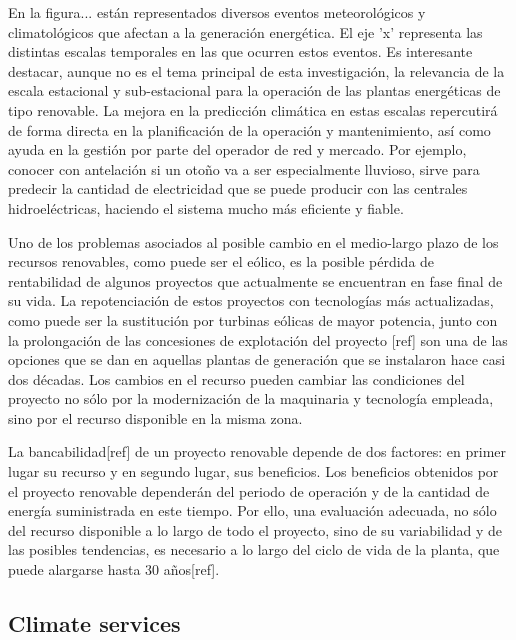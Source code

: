 En la figura... están representados diversos eventos meteorológicos y climatológicos que afectan a la generación energética. El eje 'x' representa las distintas escalas temporales en las que ocurren estos eventos. Es interesante destacar, aunque no es el tema principal de esta investigación, la relevancia de la escala estacional y sub-estacional para la operación de las plantas energéticas de tipo renovable. La mejora en la predicción climática en estas escalas repercutirá de forma directa en la planificación de la operación y mantenimiento, así como ayuda en la gestión por parte del operador de red y mercado. Por ejemplo, conocer con antelación si un otoño va a ser especialmente lluvioso, sirve para predecir la cantidad de electricidad que se puede producir con las centrales hidroeléctricas, haciendo el sistema mucho más eficiente y fiable. 

Uno de los problemas asociados al posible cambio en el medio-largo plazo de los recursos renovables, como puede ser el eólico, es la posible pérdida de rentabilidad de algunos proyectos que actualmente se encuentran en fase final de su vida. La repotenciación de estos proyectos con tecnologías más actualizadas, como puede ser la sustitución por turbinas eólicas de mayor potencia, junto con la prolongación de las concesiones de explotación del proyecto [ref] son una de las opciones que se dan en aquellas plantas de generación que se instalaron hace casi dos décadas. Los cambios en el recurso pueden cambiar las condiciones del proyecto no sólo por la modernización de la maquinaria y tecnología empleada, sino por el recurso disponible en la misma zona.

La bancabilidad[ref] de un proyecto renovable depende de dos factores: en primer lugar su recurso y en segundo lugar, sus beneficios. Los beneficios obtenidos por el proyecto renovable dependerán del periodo de operación y de la cantidad de energía suministrada en este tiempo. Por ello, una evaluación adecuada, no sólo del recurso disponible a lo largo de todo el proyecto, sino de su variabilidad y de las posibles tendencias, es necesario a lo largo del ciclo de vida de la planta, que puede alargarse hasta 30 años[ref].

\subsection{Climate services}

